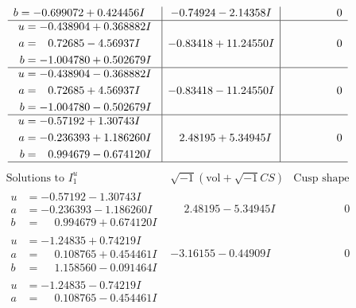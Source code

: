\documentclass[1p]{elsarticle_modified}
\theoremstyle{definition}
\newcommand{\I}{\sqrt{-1}}
\begin{document}
$$\begin{array}{c|c|c}
\begin{aligned}
b &= -0.699072 + 0.424456 I\end{aligned}
 & -0.74924 - 2.14358 I & \phantom{-0.000000 } 0 \\ \hline\begin{aligned}
u &= -0.438904 + 0.368882 I \\
a &= \phantom{-}0.72685 - 4.56937 I \\
b &= -1.004780 + 0.502679 I\end{aligned}
 & -0.83418 + 11.24550 I & \phantom{-0.000000 } 0 \\ \hline\begin{aligned}
u &= -0.438904 - 0.368882 I \\
a &= \phantom{-}0.72685 + 4.56937 I \\
b &= -1.004780 - 0.502679 I\end{aligned}
 & -0.83418 - 11.24550 I & \phantom{-0.000000 } 0 \\ \hline\begin{aligned}
u &= -0.57192 + 1.30743 I \\
a &= -0.236393 + 1.186260 I \\
b &= \phantom{-}0.994679 - 0.674120 I\end{aligned}
 & \phantom{-}2.48195 + 5.34945 I & \phantom{-0.000000 } 0\\
 \hline 
 \end{array}$$\newpage$$\begin{array}{c|c|c}  
\text{Solutions to }I^u_{1}& \I (\text{vol} + \sqrt{-1}CS) & \text{Cusp shape}\\
 \hline 
\begin{aligned}
u &= -0.57192 - 1.30743 I \\
a &= -0.236393 - 1.186260 I \\
b &= \phantom{-}0.994679 + 0.674120 I\end{aligned}
 & \phantom{-}2.48195 - 5.34945 I & \phantom{-0.000000 } 0 \\ \hline\begin{aligned}
u &= -1.24835 + 0.74219 I \\
a &= \phantom{-}0.108765 + 0.454461 I \\
b &= \phantom{-}1.158560 - 0.091464 I\end{aligned}
 & -3.16155 - 0.44909 I & \phantom{-0.000000 } 0 \\ \hline\begin{aligned}
u &= -1.24835 - 0.74219 I \\
a &= \phantom{-}0.108765 - 0.454461 I \\

\end{aligned}
\end{array}$$
\end{document}
